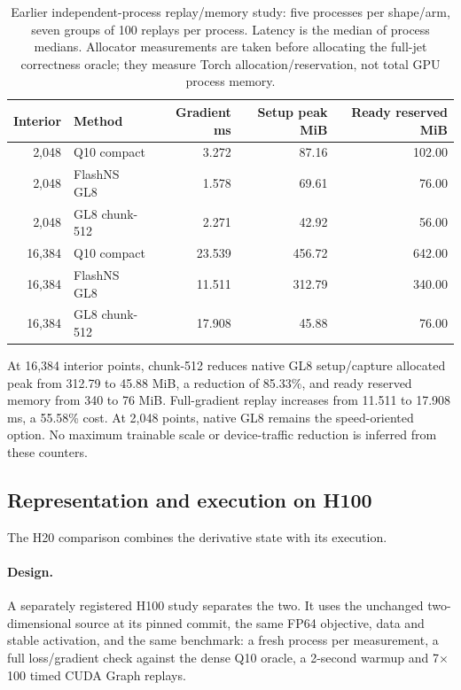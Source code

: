 \documentclass[11pt]{article}
\begin{document}
\begin{table}[t]
\centering\small
\setlength{\tabcolsep}{4pt}
\caption{Earlier independent-process replay/memory study: five processes per shape/arm, seven groups of 100 replays per process. Latency is the median of process medians. Allocator measurements are taken before allocating the full-jet correctness oracle; they measure Torch allocation/reservation, not total GPU process memory.}
\label{tab:memory}
\begin{tabular}{rlrrr}\toprule
Interior & Method & Gradient ms & Setup peak MiB & Ready reserved MiB\\\midrule
2,048 & Q10 compact & 3.272 & 87.16 & 102.00\\
2,048 & FlashNS GL8 & 1.578 & 69.61 & 76.00\\
2,048 & GL8 chunk-512 & 2.271 & 42.92 & 56.00\\
16,384 & Q10 compact & 23.539 & 456.72 & 642.00\\
16,384 & FlashNS GL8 & 11.511 & 312.79 & 340.00\\
16,384 & GL8 chunk-512 & 17.908 & 45.88 & 76.00\\
\bottomrule\end{tabular}
\end{table}

At 16,384 interior points, chunk-512 reduces native GL8 setup/capture allocated peak from 312.79 to 45.88 MiB, a reduction of 85.33\%, and ready reserved memory from 340 to 76 MiB. Full-gradient replay increases from 11.511 to 17.908 ms, a 55.58\% cost. At 2,048 points, native GL8 remains the speed-oriented option. No maximum trainable scale or device-traffic reduction is inferred from these counters.

\subsection{Representation and execution on H100}\label{sec:ablation}
The H20 comparison combines the derivative state with its execution.

\paragraph{Design.}
A separately registered H100 study separates the two. It uses the
unchanged two-dimensional source at its pinned commit, the same FP64
objective, data and stable activation, and the same benchmark: a fresh
process per measurement, a full loss/gradient check against the dense Q10
oracle, a 2-second warmup and 7$\times$100 timed CUDA Graph replays.
\end{document}
